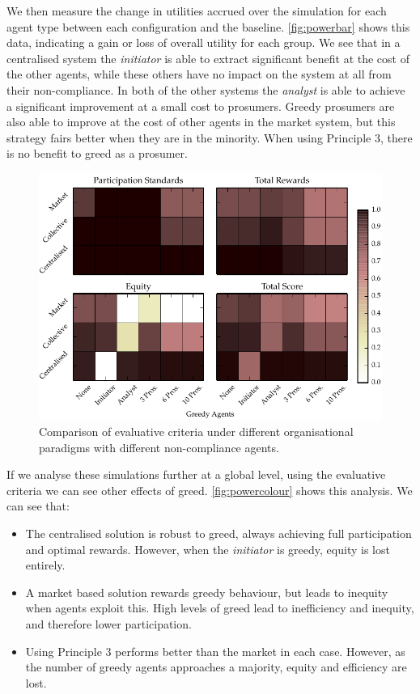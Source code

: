 We then measure the change in utilities accrued over the simulation for each
agent type between each configuration and the baseline. \autoref{fig:powerbar}
shows this data, indicating a gain or loss of overall utility for each group.
We see that in a centralised system the \emph{initiator} is able to extract
significant benefit at the cost of the other agents, while these others have
no impact on the system at all from their non-compliance. In both of the other
systems the \emph{analyst} is able to achieve a significant improvement at a
small cost to prosumers. Greedy prosumers are also able to improve at
the cost of other agents in the market system, but this strategy fairs better
when they are in the minority. When using Principle 3, there is no benefit to
greed as a prosumer.

\begin{figure}
\includegraphics{gfx/kc/powercolour.pdf} 
\caption{Comparison of evaluative criteria under different organisational paradigms with different non-compliance agents.}\label{fig:powercolour}
\end{figure}

If we analyse these simulations further at a global level, using the
evaluative criteria we can see other effects of greed.
\autoref{fig:powercolour} shows this analysis. We can see that:

\begin{itemize}
\item The centralised solution is robust to greed, always achieving full participation and optimal rewards. However, when the \emph{initiator} is greedy, equity is lost entirely.
\item A market based solution rewards greedy behaviour, but leads to inequity when agents exploit this. High levels of greed lead to inefficiency and inequity, and therefore lower participation.
\item Using Principle 3 performs better than the market in each case. However, as the number of greedy agents approaches a majority, equity and efficiency are lost.
\end{itemize}

